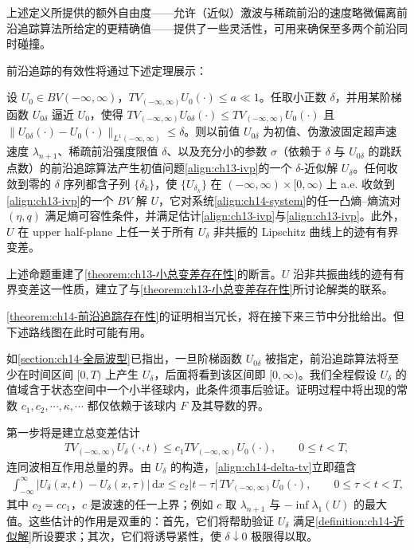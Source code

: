 \documentclass[../../main.tex]{subfiles}
\begin{document}
上述定义所提供的额外自由度——允许（近似）激波与稀疏前沿的速度略微偏离前沿追踪算法所给定的更精确值——提供了一些灵活性，可用来确保至多两个前沿同时碰撞。

前沿追踪的有效性将通过下述定理展示：

\begin{theorem}\label{theorem:ch14-前沿追踪存在性}
设 $U_0\in BV(-\infty,\infty)$，$TV_{(-\infty,\infty)}U_0(\cdot)\leqslant a\ll1$。任取小正数 $\delta$，并用某阶梯函数 $U_{0\delta}$ 逼近 $U_0$，使得 $TV_{(-\infty,\infty)}U_{0\delta}(\cdot)\leqslant TV_{(-\infty,\infty)}U_0(\cdot)$ 且 $\|U_{0\delta}(\cdot)-U_0(\cdot)\|_{L^1(-\infty,\infty)}\leqslant\delta$。则以前值 $U_{0\delta}$ 为初值、伪激波固定超声速速度 $\lambda_{n+1}$、稀疏前沿强度限值 $\delta$、以及充分小的参数 $\sigma$（依赖于 $\delta$ 与 $U_{0\delta}$ 的跳跃点数）的前沿追踪算法产生初值问题\eqref{align:ch13-ivp}的一个 $\delta$-近似解 $U_\delta$。任何收敛到零的 $\delta$ 序列都含子列 $\{\delta_k\}$，使 $\{U_{\delta_k}\}$ 在 $(-\infty,\infty)\times[0,\infty)$ 上 a.e. 收敛到\eqref{align:ch13-ivp}的一个 $BV$ 解 $U$，它对系统\eqref{align:ch14-system}的任一凸熵--熵流对 $(\eta,q)$ 满足熵可容性条件，并满足估计\eqref{align:ch13-ivp}与\eqref{align:ch13-ivp}。此外，$U$ 在 upper half-plane 上任一关于所有 $U_\delta$ 非共振的 Lipschitz 曲线上的迹有有界变差。
\end{theorem}



上述命题重建了\cref{theorem:ch13-小总变差存在性}的断言。$U$ 沿非共振曲线的迹有有界变差这一性质，建立了与\cref{theorem:ch13-小总变差存在性}所讨论解类的联系。



\cref{theorem:ch14-前沿追踪存在性}的证明相当冗长，将在接下来三节中分批给出。但下述路线图在此时可能有用。

如\cref{section:ch14-全局波型}已指出，一旦阶梯函数 $U_{0\delta}$ 被指定，前沿追踪算法将至少在时间区间 $[0,T)$ 上产生 $U_\delta$，后面将看到该区间即 $[0,\infty)$。我们全程假设 $U_\delta$ 的值域含于状态空间中一个小半径球内，此条件须事后验证。证明过程中将出现的常数 $c_1,c_2,\cdots,\kappa,\cdots$ 都仅依赖于该球内 $F$ 及其导数的界。

第一步将是建立总变差估计
\begin{align}
TV_{(-\infty,\infty)}U_\delta(\cdot,t)\leqslant c_1TV_{(-\infty,\infty)}U_0(\cdot),\qquad 0\leqslant t<T,
\label{align:ch14-delta-tv}
\end{align}
连同波相互作用总量的界。由 $U_\delta$ 的构造，\eqref{align:ch14-delta-tv}立即蕴含
\begin{align}
\int_{-\infty}^{\infty}|U_\delta(x,t)-U_\delta(x,\tau)|\,\mathrm{d}x\leqslant c_2|t-\tau|\,TV_{(-\infty,\infty)}U_0(\cdot),\qquad 0\leqslant\tau<t<T,
\label{align:ch14-delta-lip}
\end{align}
其中 $c_2=cc_1$，$c$ 是波速的任一上界；例如 $c$ 取 $\lambda_{n+1}$ 与 $-\inf\lambda_1(U)$ 的最大值。这些估计的作用是双重的：首先，它们将帮助验证 $U_\delta$ 满足\cref{definition:ch14-近似解}所设要求；其次，它们将诱导紧性，使 $\delta\downarrow0$ 极限得以取。
\end{document}
